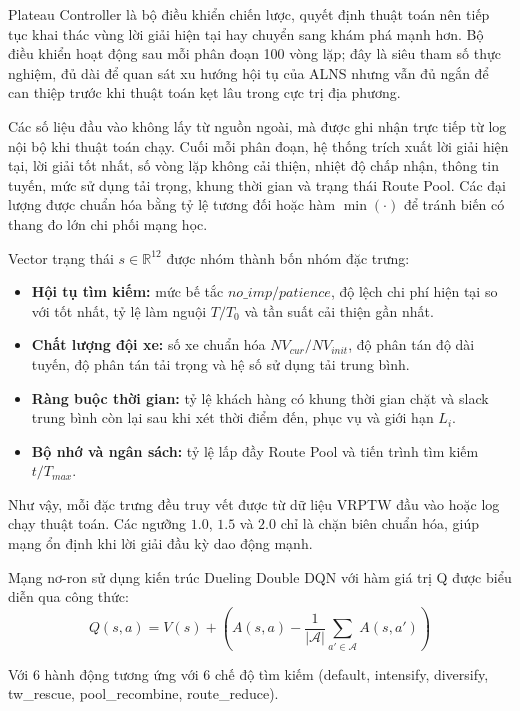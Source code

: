 \documentclass[13pt,a4paper]{extarticle}
\begin{document}
Plateau Controller là bộ điều khiển chiến lược, quyết định thuật toán nên tiếp tục khai thác vùng lời giải hiện tại hay chuyển sang khám phá mạnh hơn. Bộ điều khiển hoạt động sau mỗi phân đoạn 100 vòng lặp; đây là siêu tham số thực nghiệm, đủ dài để quan sát xu hướng hội tụ của ALNS nhưng vẫn đủ ngắn để can thiệp trước khi thuật toán kẹt lâu trong cực trị địa phương.

Các số liệu đầu vào không lấy từ nguồn ngoài, mà được ghi nhận trực tiếp từ log nội bộ khi thuật toán chạy. Cuối mỗi phân đoạn, hệ thống trích xuất lời giải hiện tại, lời giải tốt nhất, số vòng lặp không cải thiện, nhiệt độ chấp nhận, thông tin tuyến, mức sử dụng tải trọng, khung thời gian và trạng thái Route Pool. Các đại lượng được chuẩn hóa bằng tỷ lệ tương đối hoặc hàm $\min(\cdot)$ để tránh biến có thang đo lớn chi phối mạng học.

Vector trạng thái $s \in \mathbb{R}^{12}$ được nhóm thành bốn nhóm đặc trưng:
\begin{itemize}[leftmargin=1.2cm,itemsep=0.03cm]
  \item \textbf{Hội tụ tìm kiếm:} mức bế tắc $no\_imp/patience$, độ lệch chi phí hiện tại so với tốt nhất, tỷ lệ làm nguội $T/T_0$ và tần suất cải thiện gần nhất.
  \item \textbf{Chất lượng đội xe:} số xe chuẩn hóa $NV_{cur}/NV_{init}$, độ phân tán độ dài tuyến, độ phân tán tải trọng và hệ số sử dụng tải trung bình.
  \item \textbf{Ràng buộc thời gian:} tỷ lệ khách hàng có khung thời gian chặt và slack trung bình còn lại sau khi xét thời điểm đến, phục vụ và giới hạn $L_i$.
  \item \textbf{Bộ nhớ và ngân sách:} tỷ lệ lấp đầy Route Pool và tiến trình tìm kiếm $t/T_{max}$.
\end{itemize}

Như vậy, mỗi đặc trưng đều truy vết được từ dữ liệu VRPTW đầu vào hoặc log chạy thuật toán. Các ngưỡng $1.0$, $1.5$ và $2.0$ chỉ là chặn biên chuẩn hóa, giúp mạng ổn định khi lời giải đầu kỳ dao động mạnh.

Mạng nơ-ron sử dụng kiến trúc Dueling Double DQN \cite{wang2016} với hàm giá trị Q được biểu diễn qua công thức:
\begin{equation}
Q(s, a) = V(s) + \left( A(s, a) - \frac{1}{|\mathcal{A}|} \sum_{a' \in \mathcal{A}} A(s, a') \right)
\end{equation}

Với 6 hành động tương ứng với 6 chế độ tìm kiếm (default, intensify, diversify, tw\_rescue, pool\_recombine, route\_reduce).
\end{document}
